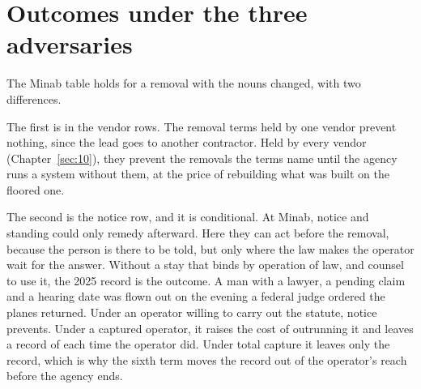 \section{Outcomes under the three adversaries}
\label{sec:9.7}
The Minab table holds for a removal with the nouns changed, with two differences.

The first is in the vendor rows. The removal terms held by one vendor prevent nothing, since the lead goes to another contractor. Held by every vendor (Chapter~\ref{sec:10}), they prevent the removals the terms name until the agency runs a system without them, at the price of rebuilding what was built on the floored one.

The second is the notice row, and it is conditional. At Minab, notice and standing could only remedy afterward. Here they can act before the removal, because the person is there to be told, but only where the law makes the operator wait for the answer. Without a stay that binds by operation of law, and counsel to use it, the 2025 record is the outcome. A man with a lawyer, a pending claim and a hearing date was flown out on the evening a federal judge ordered the planes returned. Under an operator willing to carry out the statute, notice prevents. Under a captured operator, it raises the cost of outrunning it and leaves a record of each time the operator did. Under total capture it leaves only the record, which is why the sixth term moves the record out of the operator's reach before the agency ends.
